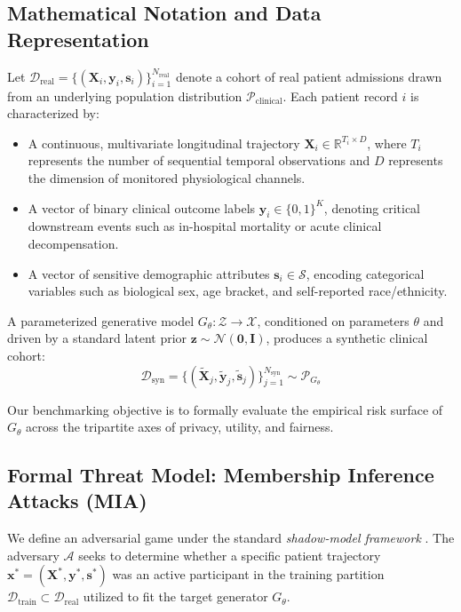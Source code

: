 \documentclass[journal]{IEEEtran}
\begin{document}
\subsection{Mathematical Notation and Data Representation}
Let $\mathcal{D}_{\text{real}} = \{(\mathbf{X}_i, \mathbf{y}_i, \mathbf{s}_i)\}_{i=1}^{N_{\text{real}}}$ denote a cohort of real patient admissions drawn from an underlying population distribution $\mathcal{P}_{\text{clinical}}$. Each patient record $i$ is characterized by:
\begin{itemize}
    \item A continuous, multivariate longitudinal trajectory $\mathbf{X}_i \in \mathbb{R}^{T_i \times D}$, where $T_i$ represents the number of sequential temporal observations and $D$ represents the dimension of monitored physiological channels.
    \item A vector of binary clinical outcome labels $\mathbf{y}_i \in \{0, 1\}^K$, denoting critical downstream events such as in-hospital mortality or acute clinical decompensation.
    \item A vector of sensitive demographic attributes $\mathbf{s}_i \in \mathcal{S}$, encoding categorical variables such as biological sex, age bracket, and self-reported race/ethnicity.
\end{itemize}

A parameterized generative model $G_\theta: \mathcal{Z} \to \mathcal{X}$, conditioned on parameters $\theta$ and driven by a standard latent prior $\mathbf{z} \sim \mathcal{N}(\mathbf{0}, \mathbf{I})$, produces a synthetic clinical cohort:
\begin{equation}
\mathcal{D}_{\text{syn}} = \{(\tilde{\mathbf{X}}_j, \tilde{\mathbf{y}}_j, \tilde{\mathbf{s}}_j)\}_{j=1}^{N_{\text{syn}}} \sim \mathcal{P}_{G_\theta}
\end{equation}

Our benchmarking objective is to formally evaluate the empirical risk surface of $G_\theta$ across the tripartite axes of privacy, utility, and fairness.

\subsection{Formal Threat Model: Membership Inference Attacks (MIA)}
We define an adversarial game under the standard \textit{shadow-model framework} \cite{shokri2017membership, stadler2022synthetic}. The adversary $\mathcal{A}$ seeks to determine whether a specific patient trajectory $\mathbf{x}^* = (\mathbf{X}^*, \mathbf{y}^*, \mathbf{s}^*)$ was an active participant in the training partition $\mathcal{D}_{\text{train}} \subset \mathcal{D}_{\text{real}}$ utilized to fit the target generator $G_\theta$.
\end{document}
